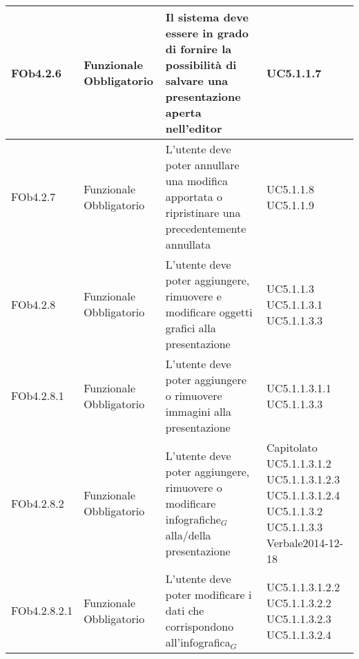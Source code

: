 \begin{longtable}{|l|p{2.5cm}|p{5cm}|p{3.5cm}|}
\hline
FOb4.2.6 & Funzionale \linebreak Obbligatorio & Il sistema deve essere in grado di fornire la possibilità di salvare una presentazione aperta nell'editor & UC5.1.1.7 \linebreak  \\
\hline
FOb4.2.7 & Funzionale \linebreak Obbligatorio & L'utente deve poter annullare una modifica apportata o ripristinare una precedentemente annullata & UC5.1.1.8 \linebreak  UC5.1.1.9 \linebreak  \\
\hline
FOb4.2.8 & Funzionale \linebreak Obbligatorio & L'utente deve poter aggiungere, rimuovere e modificare oggetti grafici alla presentazione & UC5.1.1.3 \linebreak  UC5.1.1.3.1 \linebreak  UC5.1.1.3.3 \linebreak  \\
\hline
FOb4.2.8.1 & Funzionale \linebreak Obbligatorio & L'utente deve poter aggiungere o rimuovere immagini alla presentazione & UC5.1.1.3.1.1 \linebreak  UC5.1.1.3.3 \linebreak  \\
\hline
FOb4.2.8.2 & Funzionale \linebreak Obbligatorio & L'utente deve poter aggiungere, rimuovere o modificare infografiche$_G$ alla/della presentazione & Capitolato \linebreak  UC5.1.1.3.1.2 \linebreak  UC5.1.1.3.1.2.3 \linebreak  UC5.1.1.3.1.2.4 \linebreak  UC5.1.1.3.2 \linebreak  UC5.1.1.3.3 \linebreak  Verbale2014-12-18 \linebreak  \\
\hline
FOb4.2.8.2.1 & Funzionale \linebreak Obbligatorio & L'utente deve poter modificare i dati che corrispondono all'infografica$_G$ & UC5.1.1.3.1.2.2 \linebreak  UC5.1.1.3.2.2 \linebreak  UC5.1.1.3.2.3 \linebreak  UC5.1.1.3.2.4 \linebreak  \\

\end{longtable}
